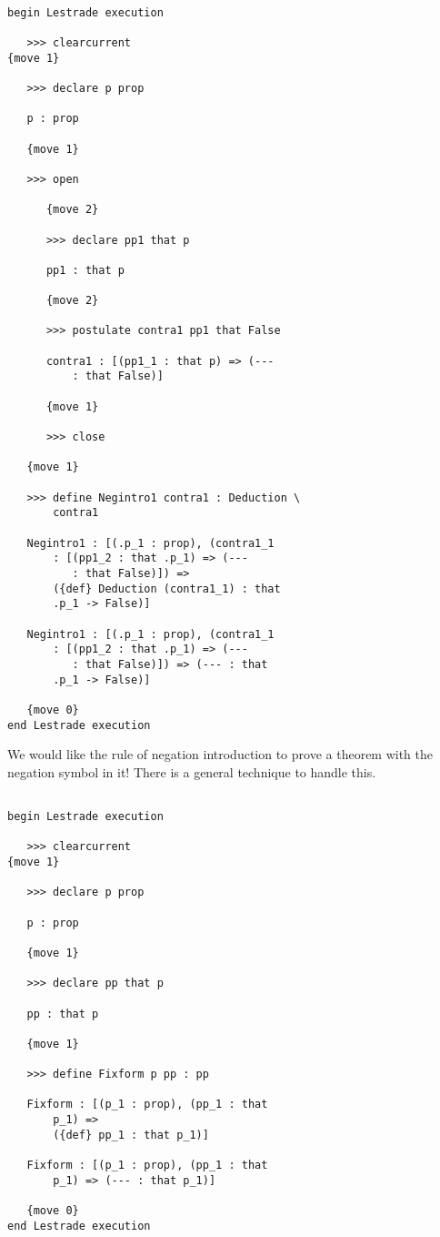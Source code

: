 \documentclass[12pt]{article}
\begin{document}
\begin{verbatim}

begin Lestrade execution

   >>> clearcurrent
{move 1}

   >>> declare p prop

   p : prop

   {move 1}

   >>> open

      {move 2}

      >>> declare pp1 that p

      pp1 : that p

      {move 2}

      >>> postulate contra1 pp1 that False

      contra1 : [(pp1_1 : that p) => (--- 
          : that False)]

      {move 1}

      >>> close

   {move 1}

   >>> define Negintro1 contra1 : Deduction \
       contra1

   Negintro1 : [(.p_1 : prop), (contra1_1 
       : [(pp1_2 : that .p_1) => (--- 
          : that False)]) => 
       ({def} Deduction (contra1_1) : that 
       .p_1 -> False)]

   Negintro1 : [(.p_1 : prop), (contra1_1 
       : [(pp1_2 : that .p_1) => (--- 
          : that False)]) => (--- : that 
       .p_1 -> False)]

   {move 0}
end Lestrade execution

\end{verbatim}

We would like the rule of negation introduction to prove a theorem with the negation symbol in it!  There is a general technique to handle this.

\begin{verbatim}

begin Lestrade execution

   >>> clearcurrent
{move 1}

   >>> declare p prop

   p : prop

   {move 1}

   >>> declare pp that p

   pp : that p

   {move 1}

   >>> define Fixform p pp : pp

   Fixform : [(p_1 : prop), (pp_1 : that 
       p_1) => 
       ({def} pp_1 : that p_1)]

   Fixform : [(p_1 : prop), (pp_1 : that 
       p_1) => (--- : that p_1)]

   {move 0}
end Lestrade execution

\end{verbatim}
\end{document}

